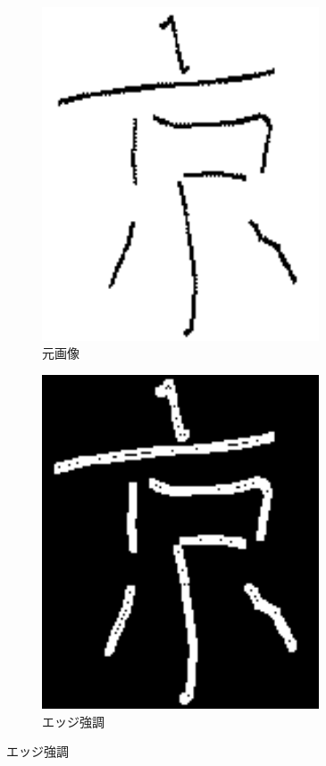 \documentclass[a4paper,12pt]{jsarticle}
\begin{document}
\begin{figure}[!htbp]
\centering
\begin{subfigure}[b]{0.45\textwidth}
    \centering
    \includegraphics[width=0.9\textwidth]{./sampleimages/sample13.png}
    \caption{元画像}
\end{subfigure}
\hfill
\begin{subfigure}[b]{0.45\textwidth}
    \centering
    \includegraphics[width=0.9\textwidth]{./images/edge_enhanced_sample13_edge.png}
    \caption{エッジ強調}
\end{subfigure}


\end{figure}
\end{document}
